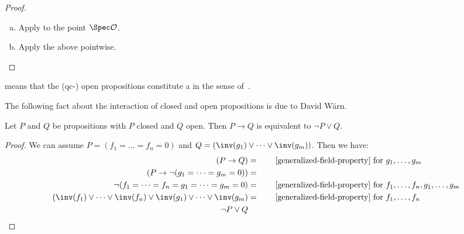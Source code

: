 \begin{proof}
  \begin{enumerate}[(a)]
  \item Apply  to the point $\Spec \A$.
  \item Apply the above pointwise.
  \end{enumerate}
\end{proof}

\begin{remark}
   means that
  the (qc-) open propositions constitute a 
  in the sense of~\cite{rosolini-phd-thesis}.
\end{remark}

The following fact about the interaction of closed and open propositions
is due to David Wärn.

\begin{lemma}%
  \label{implication-from-closed-to-open}
  Let $P$ and $Q$ be propositions
  with $P$ closed and $Q$ open.
  Then $P \to Q$ is equivalent to $\lnot P \lor Q$.
\end{lemma}

\begin{proof}
  We can assume $P = (f_1 = \dots = f_n = 0)$
  and $Q = (\inv(g_1) \lor \dots \lor \inv(g_m))$.
  Then we have:
  \begin{align*}
    (P \to Q) &= \qquad
    \text{\Cref{generalized-field-property} for $g_1, \dots, g_m$}\\
    (P \to \lnot (g_1 = \dots = g_m = 0)) &= \\
    \lnot (f_1 = \dots = f_n = g_1 = \dots = g_m = 0) &= \qquad
    \text{\Cref{generalized-field-property} for $f_1, \dots, f_n, g_1, \dots, g_m$}\\
    (\inv(f_1) \lor \dots \lor \inv(f_n) \lor \inv(g_1) \lor \dots \lor \inv(g_m) &= \qquad
    \text{\Cref{generalized-field-property} for $f_1, \dots, f_n$}\\
    \lnot P \lor Q &
  \end{align*}
\end{proof}


